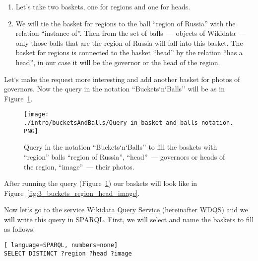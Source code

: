 \begin{enumerate}
    \item Let's take two baskets, one for regions and one for heads.
    \item We will tie the basket for regions to the ball ``region of Russia'' with the relation ``instance of''. Then from the set of balls~--- objects of Wikidata~--- only those balls that are the region of Russia will fall into this basket. The basket for regions is connected to the basket ``head'' by the relation ``has a head'', in our case it will be the governor or the head of the region.
\end{enumerate}

Let`s make the request more interesting and add another basket for photos of governors. Now the query in the notation ``Buckets`n`Balls'' will be as in Figure~\ref{fig:Query_in_basket_and_balls_notation}.

\begin{figure}[h!]
    \texttt{[image: ./intro/bucketsAndBalls/Query\_in\_basket\_and\_balls\_notation.PNG]}
    \caption{Query in the notation ``Buckets`n`Balls'' to fill the baskets with ``region'' balls ``region of Russia'', ``head''~--- governors or heads of the region, ``image''~--- their photos.}
	\label{fig:Query_in_basket_and_balls_notation}
\end{figure}

After running the query (Figure~\ref{fig:Query_in_basket_and_balls_notation}) our baskets will look like in Figure~\ref{fig:3_buckets_region_head_image}.

\begin{marginfigure}
	{
		\setlength{\fboxsep}{0pt}%
		\setlength{\fboxrule}{1pt}%
	}
    \caption{Baskets after running the request in Figure~\ref{fig:Query_in_basket_and_balls_notation}. \textit{?region} are the regions of Russia, \textit{?head} are the heads, \textit{?image} are photos of heads.}
	\label{fig:3_buckets_region_head_image}
\end{marginfigure}

Now let`s go to the service \href{https://query.wikidata.org/}{Wikidata Query Service} 
(hereinafter WDQS) 
and we will write this query in SPARQL. First, we will select and name the baskets to fill as follows:

\begin{lstlisting}[ language=SPARQL, numbers=none]
SELECT DISTINCT ?region ?head ?image
\end{lstlisting}

